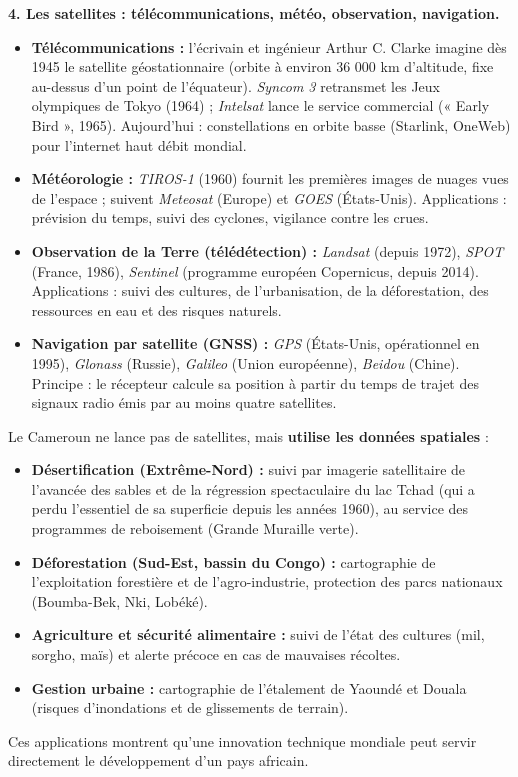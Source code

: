 \documentclass[11pt]{article}
\begin{document}
\textbf{4. Les satellites : télécommunications, météo, observation, navigation.}
\begin{itemize}
    \item \textbf{Télécommunications :} l'écrivain et ingénieur Arthur C. Clarke imagine dès 1945 le satellite géostationnaire (orbite à environ 36 000 km d'altitude, fixe au-dessus d'un point de l'équateur). \textit{Syncom 3} retransmet les Jeux olympiques de Tokyo (1964) ; \textit{Intelsat} lance le service commercial (« Early Bird », 1965). Aujourd'hui : constellations en orbite basse (Starlink, OneWeb) pour l'internet haut débit mondial.
    \item \textbf{Météorologie :} \textit{TIROS-1} (1960) fournit les premières images de nuages vues de l'espace ; suivent \textit{Meteosat} (Europe) et \textit{GOES} (États-Unis). Applications : prévision du temps, suivi des cyclones, vigilance contre les crues.
    \item \textbf{Observation de la Terre (télédétection) :} \textit{Landsat} (depuis 1972), \textit{SPOT} (France, 1986), \textit{Sentinel} (programme européen Copernicus, depuis 2014). Applications : suivi des cultures, de l'urbanisation, de la déforestation, des ressources en eau et des risques naturels.
    \item \textbf{Navigation par satellite (GNSS) :} \textit{GPS} (États-Unis, opérationnel en 1995), \textit{Glonass} (Russie), \textit{Galileo} (Union européenne), \textit{Beidou} (Chine). Principe : le récepteur calcule sa position à partir du temps de trajet des signaux radio émis par au moins quatre satellites.
\end{itemize}

\begin{savaistu}
Le Cameroun ne lance pas de satellites, mais \textbf{utilise les données spatiales} :
\begin{itemize}
    \item \textbf{Désertification (Extrême-Nord) :} suivi par imagerie satellitaire de l'avancée des sables et de la régression spectaculaire du lac Tchad (qui a perdu l'essentiel de sa superficie depuis les années 1960), au service des programmes de reboisement (Grande Muraille verte).
    \item \textbf{Déforestation (Sud-Est, bassin du Congo) :} cartographie de l'exploitation forestière et de l'agro-industrie, protection des parcs nationaux (Boumba-Bek, Nki, Lobéké).
    \item \textbf{Agriculture et sécurité alimentaire :} suivi de l'état des cultures (mil, sorgho, maïs) et alerte précoce en cas de mauvaises récoltes.
    \item \textbf{Gestion urbaine :} cartographie de l'étalement de Yaoundé et Douala (risques d'inondations et de glissements de terrain).
\end{itemize}
Ces applications montrent qu'une innovation technique mondiale peut servir directement le développement d'un pays africain.
\end{savaistu}
\end{document}
